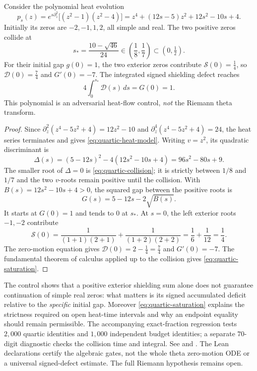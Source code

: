 \begin{proposition}\label{prop:quartic-shielding-control}
Consider the polynomial heat evolution
\begin{equation}
p_s(z)=e^{s\partial_z^2}
\bigl[(z^2-1)(z^2-4)\bigr]
=z^4+(12s-5)z^2+12s^2-10s+4.
\label{eq:quartic-heat-model}
\end{equation}
Initially its zeros are $-2,-1,1,2$,
all simple and real. The two positive zeros
collide at
\begin{equation}
s_*=\frac{10-\sqrt{46}}{24}
\in\left(\frac18,\frac17\right)
\subset(0,\tfrac12).
\label{eq:quartic-collision}
\end{equation}
For their initial gap $g(0)=1$, the two
exterior zeros contribute
$\mathcal S(0)=\frac14$, so
$\mathcal D(0)=\frac74$ and $G'(0)=-7$.
The integrated signed shielding defect reaches
\begin{equation}
4\int_0^{s_*}\mathcal D(s)\,ds
=G(0)=1.
\label{eq:quartic-saturation}
\end{equation}
This polynomial is an adversarial
heat-flow control, \emph{not} the
Riemann theta transform.
\end{proposition}
\begin{proof}
Since $\partial_z^2(z^4-5z^2+4)=12z^2-10$
and $\partial_z^4(z^4-5z^2+4)=24$,
the heat series terminates and gives
\eqref{eq:quartic-heat-model}.
Writing $v=z^2$, its quadratic
discriminant is
\[
\Delta(s)=(5-12s)^2
-4(12s^2-10s+4)
=96s^2-80s+9.
\]
The smaller root of $\Delta=0$
is \eqref{eq:quartic-collision}; it is
strictly between $1/8$ and $1/7$
and the two $v$-roots remain positive
until the collision. With
$B(s)=12s^2-10s+4>0$, the squared gap
between the positive roots is
\[
G(s)=5-12s-2\sqrt{B(s)}.
\]
It starts at $G(0)=1$ and tends to
$0$ at $s_*$. At $s=0$, the left
exterior roots $-1,-2$ contribute
\[
\mathcal S(0)
=\frac1{(1+1)(2+1)}
+\frac1{(1+2)(2+2)}
=\frac16+\frac1{12}=\frac14.
\]
The zero-motion equation gives
$\mathcal D(0)=2-\frac14=\frac74$
and $G'(0)=-7$.
The fundamental theorem of calculus
applied up to the collision gives
\eqref{eq:quartic-saturation}.
\end{proof}

The control shows that a positive exterior
shielding sum alone does not guarantee
continuation of simple real zeros:
what matters is its signed accumulated
deficit relative to the \emph{specific}
initial gap. Moreover
\eqref{eq:quartic-saturation} explains the
strictness required on open heat-time
intervals and why an endpoint equality
should remain permissible. The accompanying
exact-fraction regression tests $2{,}000$
quartic identities and $1{,}000$ independent
budget identities; a separate $70$-digit
diagnostic checks the collision time and
integral. See
and .
The Lean declarations certify the algebraic
gates, not the whole theta zero-motion
ODE or a universal signed-defect estimate.
The full Riemann hypothesis remains open.
